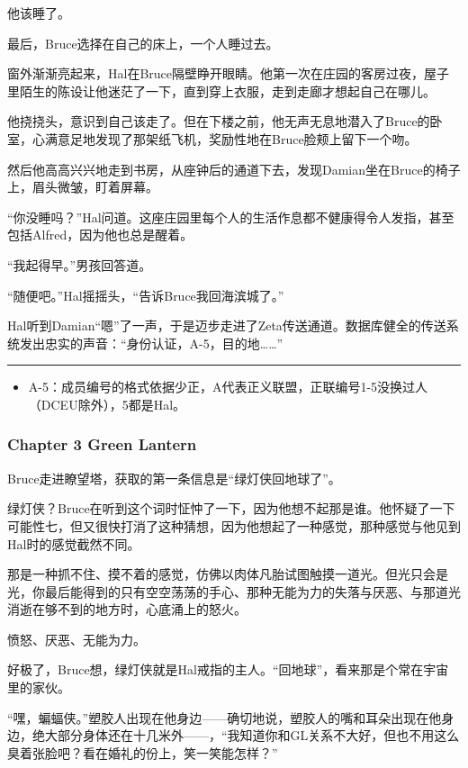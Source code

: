 \documentclass[../main.tex]{subfiles}
\begin{document}
他该睡了。

最后，Bruce选择在自己的床上，一个人睡过去。

窗外渐渐亮起来，Hal在Bruce隔壁睁开眼睛。他第一次在庄园的客房过夜，屋子里陌生的陈设让他迷茫了一下，直到穿上衣服，走到走廊才想起自己在哪儿。

他挠挠头，意识到自己该走了。但在下楼之前，他无声无息地潜入了Bruce的卧室，心满意足地发现了那架纸飞机，奖励性地在Bruce脸颊上留下一个吻。

然后他高高兴兴地走到书房，从座钟后的通道下去，发现Damian坐在Bruce的椅子上，眉头微皱，盯着屏幕。

“你没睡吗？”Hal问道。这座庄园里每个人的生活作息都不健康得令人发指，甚至包括Alfred，因为他也总是醒着。

“我起得早。”男孩回答道。

“随便吧。”Hal摇摇头，“告诉Bruce我回海滨城了。”

Hal听到Damian“嗯”了一声，于是迈步走进了Zeta传送通道。数据库健全的传送系统发出忠实的声音：“身份认证，A-5，目的地\ldots\ldots”

\begin{center}\rule{0.5\linewidth}{0.5pt}\end{center}

\begin{itemize}
  \item
        A-5：成员编号的格式依据少正，A代表正义联盟，正联编号1-5没换过人（DCEU除外），5都是Hal。
\end{itemize}

\hypertarget{chapter-3-green-lantern}{%
  \subsubsection{Chapter 3 Green Lantern}\label{chapter-3-green-lantern}}

Bruce走进瞭望塔，获取的第一条信息是“绿灯侠回地球了”。

绿灯侠？Bruce在听到这个词时怔忡了一下，因为他想不起那是谁。他怀疑了一下可能性七，但又很快打消了这种猜想，因为他想起了一种感觉，那种感觉与他见到Hal时的感觉截然不同。

那是一种抓不住、摸不着的感觉，仿佛以肉体凡胎试图触摸一道光。但光只会是光，你最后能得到的只有空空荡荡的手心、那种无能为力的失落与厌恶、与那道光消逝在够不到的地方时，心底涌上的怒火。

愤怒、厌恶、无能为力。

好极了，Bruce想，绿灯侠就是Hal戒指的主人。“回地球”，看来那是个常在宇宙里的家伙。

“嘿，蝙蝠侠。”塑胶人出现在他身边——确切地说，塑胶人的嘴和耳朵出现在他身边，绝大部分身体还在十几米外——，“我知道你和GL关系不大好，但也不用这么臭着张脸吧？看在婚礼的份上，笑一笑能怎样？”
\end{document}
